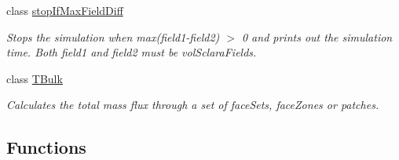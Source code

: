 \begin{DoxyCompactItemize}
class \hyperlink{classFoam_1_1functionObjects_1_1stopIfMaxFieldDiff}{stop\+If\+Max\+Field\+Diff}
\begin{DoxyCompactList}\small\item\em Stops the simulation when max(field1-\/field2) $>$ 0 and prints out the simulation time. Both field1 and field2 must be vol\+Sclara\+Fields. \end{DoxyCompactList}\item 
class \hyperlink{classFoam_1_1functionObjects_1_1TBulk}{T\+Bulk}
\begin{DoxyCompactList}\small\item\em Calculates the total mass flux through a set of face\+Sets, face\+Zones or patches. \end{DoxyCompactList}\end{DoxyCompactItemize}
\subsection*{Functions}
